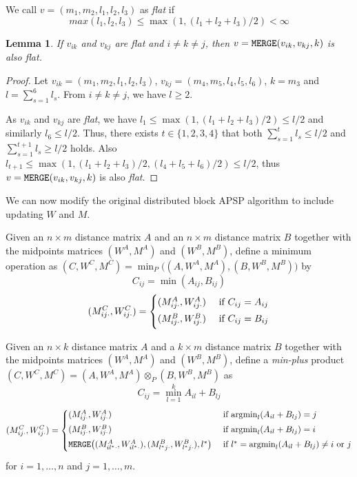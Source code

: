 \documentclass{article} %
\newtheorem{lemma}[theorem]{Lemma}
\newcommand{\argmin}{\mathrm{argmin}}
\begin{document}
We call $v = (m_1, m_2, l_1, l_2, l_3)$ as \textit{flat} if 
$$max(l_1, l_2, l_3) \leq \max(1, (l_1 + l_2 + l_3)/2) < \infty$$


\begin{lemma}
If $v_{ik}$ and $v_{kj}$ are \textit{flat} and $i \neq k \neq j$, then $v = {\tt MERGE}(v_{ik}, v_{kj}, k)$ is also \textit{flat}.
\end{lemma}

\begin{proof}
Let $v_{ik} = (m_1, m_2, l_1, l_2, l_3)$, $v_{kj} = (m_4, m_5, l_4, l_5, l_6)$, $k = m_3$ and 
$l = \sum_{s = 1}^6 l_s$. From $i\neq k \neq j$, we have $l \geq 2$. 

As $v_{ik}$ and $v_{kj}$ are \textit{flat}, we have 
$l_1 \leq \max(1, (l_1 + l_2 + l_3)/2) \leq l/2$ and similarly $l_6 \leq l/2$. Thus, there exists
$t \in \{1, 2, 3, 4\}$ that both $\sum_{s = 1}^t l_s \leq l/2 $ and $\sum_{s = 1}^{t + 1} l_s \geq l/2$ holds.
Also $l_{t + 1} \leq \max(1, (l_1 + l_2 + l_3)/2, (l_4 + l_5 + l_6)/2) \leq l/2$, thus 
$v = {\tt MERGE}(v_{ik}, v_{kj}, k)$ is also \textit{flat}.
\end{proof}

We can now modify the original distributed block APSP algorithm to include updating $W$ and $M$. 

Given an $n \times m$ distance matrix $A$ and an $n \times m$ distance matrix $B$ together with the midpoints matrices $(W^A, M^A)$ and $(W^B, M^B)$, define a minimum operation as 
$(C, W^C, M^C) = \min_P\big((A, W^A, M^A), (B, W^B, M^B)\big)$ by
\[
C_{ij} = \min(A_{ij}, B_{ij})
\]
\[
(M^C_{ij\cdot}, W^C_{ij\cdot}) = 
\begin{cases}
\vspace{1mm}
(M^A_{ij\cdot}, W^A_{ij\cdot}) & \text{ if }C_{ij} = A_{ij} \\
\vspace{1mm}
(M^B_{ij\cdot}, W^B_{ij\cdot}) & \text{ if }C_{ij} = B_{ij} 
\end{cases}
\]



Given an $n \times k$ distance matrix $A$ and a $k \times m$ distance matrix $B$ together with the midpoints matrices $(W^A, M^A)$ and $(W^B, M^B)$, define a \emph{min-plus} product $(C, W^C, M^C) = (A, W^A, M^A) \otimes_P (B, W^B, M^B)$ as
\[
C_{ij} = \min_{l = 1}^k A_{il} + B_{lj}
\]
\[
(M^C_{ij\cdot}, W^C_{ij\cdot}) = 
\begin{cases}
\vspace{1mm}
(M^A_{ij\cdot}, W^A_{ij\cdot}) & \text{ if }\argmin_l(A_{il} + B_{lj}) = j \\
\vspace{1mm}
(M^B_{ij\cdot}, W^B_{ij\cdot}) & \text{ if }\argmin_l(A_{il} + B_{lj}) = i \\
\vspace{1mm}
{\tt MERGE}\big((M^A_{il^*\cdot}, W^A_{il^*\cdot}), (M^B_{l^*j\cdot}, W^B_{l^*j\cdot}), l^*\big)
& \text{ if } l^* = \argmin_l(A_{il} + B_{lj}) \neq i \text{ or } j
\end{cases}
\]
for $i = 1,\hdots, n$ and $j = 1,\hdots, m$.
\end{document}

